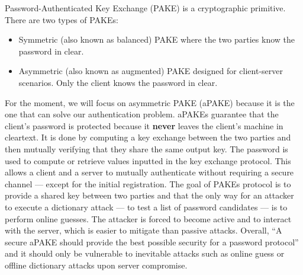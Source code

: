 ﻿\documentclass[../report.tex]{subfiles}
\begin{document}
Password-Authenticated Key Exchange (PAKE) is a cryptographic primitive. There are two types of PAKEs: 
\begin{itemize}
 \item Symmetric (also known as balanced) PAKE where the two parties know the password in clear.
 \item Asymmetric (also known as augmented) PAKE designed for client-server scenarios. Only the client knows the password in clear.
\end{itemize}
For the moment, we will focus on asymmetric PAKE (aPAKE) because it is the one that can solve our authentication problem.
aPAKEs guarantee that the client's password is protected because it \textbf{never} leaves the client's machine in cleartext.
It is done by computing a key exchange between the two parties and then mutually verifying that they share the same output key. The password is used to compute or retrieve values inputted in the key exchange protocol.
This allows a client and a server to mutually authenticate without requiring a secure channel --- except for the initial registration.
The goal of PAKEs protocol is to provide a shared key between two parties and that the only way for an attacker to execute a dictionary attack --- to test a list of password candidates --- is to perform online guesses. The attacker is forced to become active and to interact with the server, which is easier to mitigate than passive attacks.
Overall, ``A secure aPAKE should provide the best possible security for a password protocol'' \cite{OPAQUE_Standard_Draft} and it should only be vulnerable to inevitable attacks such as online guess or offline dictionary attacks upon server compromise.
\end{document}
